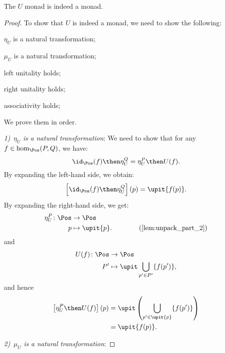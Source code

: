 \begin{lemma}
    The $U$ monad is indeed a monad.
\end{lemma}
\begin{proof}
    To show that $U$ is indeed a monad, we need to show the following:
    \begin{compactenum}
        \item $\eta_U$ is a natural transformation;
        \item $\mu_U$ is a natural transformation;
        \item left unitality holds;
        \item right unitality holds;
        \item associativity holds;
    \end{compactenum}
    We prove them in order.

    \emph{1)~$\eta_U$ is a natural transformation}: We need to show that for any~$f\in \hom_{\Pos}(P,Q)$, we have:
    \begin{equation}
        \id_{\Pos}(f)\then \eta_{U}^Q=\eta_{U}^P\then U(f).
    \end{equation}
    By expanding the left-hand side, we obtain:
    \begin{equation}
        \left[\id_{\Pos}(f)\then \eta_{U}^Q\right](p)=\upit \{f(p)\}.
    \end{equation}
    By expanding the right-hand side, we get:
    \begin{equation}
        \begin{aligned}
            \eta_{U}^P\colon \Pos &\to \Pos\\
            p&\mapsto \upit \{p\}. \qquad \qquad (\cref{lem:unpack_part_2})
        \end{aligned}
    \end{equation}
    and
    \begin{equation}
        \begin{aligned}
            U(f)\colon \Pos &\to \Pos\\
            P'&\mapsto \upit \bigcup_{p'\in P'}\{f(p')\},
        \end{aligned}
    \end{equation}
    and hence
    \begin{equation}
        \begin{aligned}
            \left[\eta_{U}^P\then U(f)\right](p)&=\upit \left( \bigcup_{p'\in \upit \{p\}} \{f(p')\}\right)\\
            &=\upit \{f(p)\}.
        \end{aligned}
    \end{equation}

    \emph{2)~$\mu_U$ is a natural transformation}:
\end{proof}
